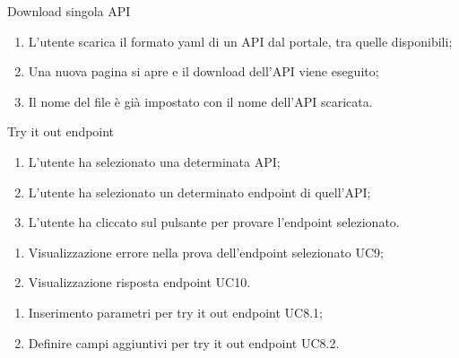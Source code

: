 \begin{usecase}{7}{Download singola API}\label{uc:download-singola-api}

    \usecasemain{}
        \begin{enumerate}
            \item L'utente scarica il formato yaml di un API dal portale, tra quelle disponibili;
            \item Una nuova pagina si apre e il download dell'API viene eseguito;
            \item Il nome del file è già impostato con il nome dell'API scaricata.
        \end{enumerate}

\end{usecase}


\begin{usecase}{8}{Try it out endpoint}\label{uc:try-it-out-endpoint}

    \usecasemain{}
        \begin{enumerate}
            \item L'utente ha selezionato una determinata API;
            \item L'utente ha selezionato un determinato endpoint di quell'API;
            \item L'utente ha cliccato sul pulsante per provare l'endpoint selezionato.
        \end{enumerate}

    \usecaseext{}
        \begin{enumerate}
            \item Visualizzazione errore nella prova dell'endpoint selezionato UC9;
            \item Visualizzazione risposta endpoint UC10.
        \end{enumerate}

    \usecasegen{}
        \begin{enumerate}
            \item Inserimento parametri per try it out endpoint UC8.1;
            \item Definire campi aggiuntivi per try it out endpoint UC8.2.
        \end{enumerate}

\end{usecase}

